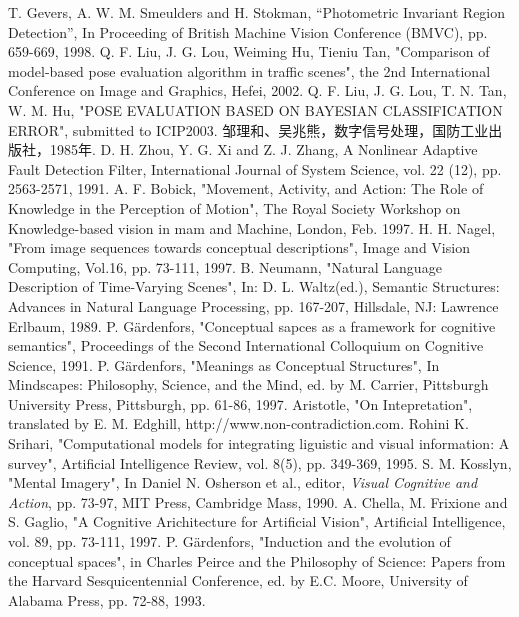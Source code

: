 \begin{thebibliography}{200}
 T. Gevers, A. W. M. Smeulders and H. Stokman, ``Photometric Invariant Region Detection'', In Proceeding of British Machine Vision Conference (BMVC), pp. 659-669, 1998.
 Q. F. Liu, J. G. Lou, Weiming Hu, Tieniu Tan, "Comparison of model-based pose evaluation algorithm in traffic scenes", the 2nd International Conference on Image and Graphics, Hefei, 2002.
 Q. F. Liu, J. G. Lou, T. N. Tan, W. M. Hu, "POSE EVALUATION BASED ON BAYESIAN CLASSIFICATION ERROR", submitted to ICIP2003.
 邹理和、吴兆熊，数字信号处理，国防工业出版社，1985年.
 D. H. Zhou, Y. G. Xi and Z. J. Zhang, A Nonlinear Adaptive Fault Detection Filter, International Journal of System Science, vol. 22 (12), pp. 2563-2571, 1991.
 A. F. Bobick, "Movement, Activity, and Action: The Role of Knowledge in the Perception of Motion", The Royal Society Workshop on Knowledge-based vision in mam and Machine, London, Feb. 1997.
 H. H. Nagel, "From image sequences towards conceptual descriptions", Image and Vision Computing, Vol.16, pp. 73-111, 1997.
 B. Neumann, "Natural Language Description of Time-Varying Scenes", In: D. L. Waltz(ed.), Semantic Structures: Advances in Natural Language Processing, pp. 167-207, Hillsdale, NJ: Lawrence Erlbaum, 1989.
 P. G\"{a}rdenfors, "Conceptual sapces as a framework for cognitive semantics", Proceedings of the Second International Colloquium on Cognitive Science, 1991.
 P. G\"{a}rdenfors, "Meanings as Conceptual Structures", In Mindscapes: Philosophy, Science, and the Mind, ed. by M. Carrier, Pittsburgh University Press, Pittsburgh, pp. 61-86, 1997.
 Aristotle, "On Intepretation", translated by E. M. Edghill, http://www.non-contradiction.com.
 Rohini K. Srihari, "Computational models for integrating liguistic and visual information: A survey", Artificial Intelligence Review, vol. 8(5), pp. 349-369, 1995.
 S. M. Kosslyn, "Mental Imagery", In Daniel N. Osherson et al., editor, \textit{Visual Cognitive and Action}, pp. 73-97, MIT Press, Cambridge Mass, 1990.
 A. Chella, M. Frixione and S. Gaglio, "A Cognitive Arichitecture for Artificial Vision", Artificial Intelligence, vol. 89, pp. 73-111, 1997.
 P. G\"{a}rdenfors, "Induction and the evolution of conceptual spaces", in Charles Peirce and the Philosophy of Science: Papers from the Harvard Sesquicentennial Conference, ed. by E.C. Moore, University of Alabama Press, pp. 72-88, 1993.

\end{thebibliography}
